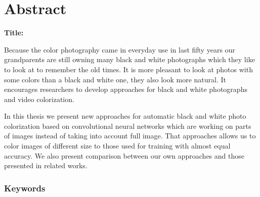 \chapter*{Abstract}

\noindent\textbf{Title:} \ttitleEn
\bigskip

Because the color photography came in everyday use in last fifty years our grandparents are still owning many black and white photographs which they like to look at to remember the old times. It is more pleasant to look at photos with some colors than a black and white one, they also look more natural. It encourages researchers to develop approaches for black and white photographs and video colorization.

In this thesis we present new approaches for automatic black and white photo colorization based on convolutional neural networks which are working on parts of images instead of taking into account full image. That approaches allows us to color images of different size to those used for training with almost equal accuracy. We also present comparison between our own approaches and those presented in related works. 


\subsection*{Keywords}
\textit{\tkeywordsEn}
\clearemptydoublepage